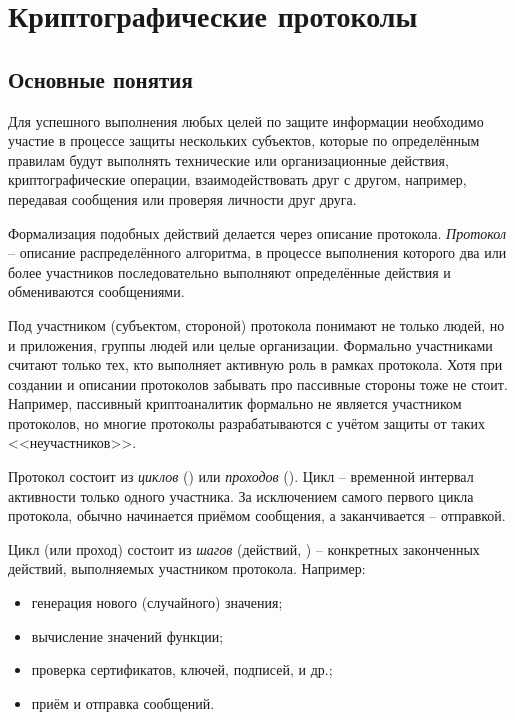\chapter{Криптографические протоколы}\label{chapter-protocols}

\section{Основные понятия}

Для успешного выполнения любых целей по защите информации необходимо участие в процессе защиты нескольких субъектов, которые по определённым правилам будут выполнять технические или организационные действия, криптографические операции, взаимодействовать друг с другом, например, передавая сообщения или проверяя личности друг друга.

Формализация подобных действий делается через описание протокола. \emph{Протокол} -- описание распределённого алгоритма, в процессе выполнения которого два или более участников последовательно выполняют определённые действия и обмениваются сообщениями.

Под участником (субъектом, стороной) протокола понимают не только людей, но и приложения, группы людей или целые организации. Формально участниками считают только тех, кто выполняет активную роль в рамках протокола. Хотя при создании и описании протоколов забывать про пассивные стороны тоже не стоит. Например, пассивный криптоаналитик формально не является участником протоколов, но многие протоколы разрабатываются с учётом защиты от таких <<неучастников>>.

Протокол состоит из \emph{циклов} () или \emph{проходов} (). Цикл -- временной интервал активности только одного участника. За исключением самого первого цикла протокола, обычно начинается приёмом сообщения, а заканчивается -- отправкой.

Цикл (или проход) состоит из \emph{шагов} (действий, ) -- конкретных законченных действий, выполняемых участником протокола. Например:
\begin{itemize}
	\item генерация нового (случайного) значения;
	\item вычисление значений функции;
	\item проверка сертификатов, ключей, подписей, и др.;
	\item приём и отправка сообщений.
\end{itemize}

